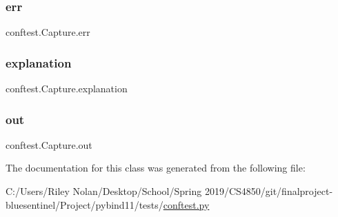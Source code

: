 \subsubsection{\texorpdfstring{err}{err}}
{\footnotesize\ttfamily conftest.\+Capture.\+err}

\mbox{\label{classconftest_1_1_capture_af23c296d760c928ba72bf2f46a29e2cc}} 
\subsubsection{\texorpdfstring{explanation}{explanation}}
{\footnotesize\ttfamily conftest.\+Capture.\+explanation}

\mbox{\label{classconftest_1_1_capture_a838f303022f5a56d27db37ab694db39b}} 
\subsubsection{\texorpdfstring{out}{out}}
{\footnotesize\ttfamily conftest.\+Capture.\+out}



The documentation for this class was generated from the following file\+:\begin{DoxyCompactItemize}
\item 
C\+:/\+Users/\+Riley Nolan/\+Desktop/\+School/\+Spring 2019/\+C\+S4850/git/finalproject-\/bluesentinel/\+Project/pybind11/tests/\mbox{\hyperlink{conftest_8py}{conftest.\+py}}\end{DoxyCompactItemize}

